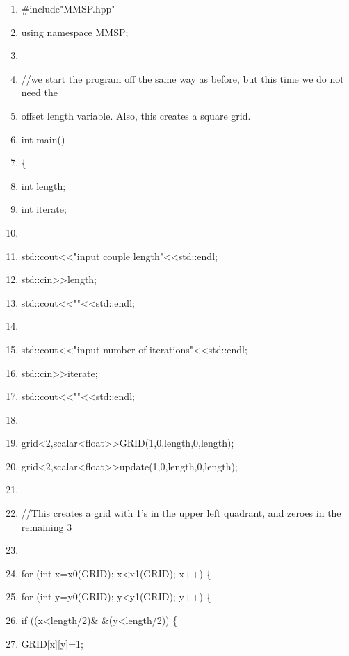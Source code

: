 \documentclass{article}
\begin{document}
\begin{shadebox}
\begin{enumerate} \itemsep1pt \parskip0pt 
\item \#include"MMSP.hpp"
\item using namespace MMSP; 
\item 
\item //we start the program off the same way as before, but this time we do not need the 
\item offset length variable. Also, this creates a square grid.
\item int main()
\item \{ 
\item int length;
\item int iterate;
\item 
\item std::cout\textless \textless "input couple length"\textless \textless std::endl;
\item std::cin\textgreater \textgreater length;
\item std::cout\textless \textless ""\textless \textless std::endl;
\item 
\item std::cout\textless \textless "input number of iterations"\textless \textless std::endl;
\item std::cin\textgreater \textgreater iterate;
\item std::cout\textless \textless ""\textless \textless std::endl;
\item 
\item grid\textless 2,scalar\textless float\textgreater  \textgreater  GRID(1,0,length,0,length); 
\item grid\textless 2,scalar\textless float\textgreater  \textgreater  update(1,0,length,0,length);
\item 
\item //This creates a grid with 1’s in the upper left quadrant, and zeroes in the remaining 3
\item 
\item for (int x=x0(GRID); x\textless x1(GRID); x++) \{
\item \hspace{10pt}         for (int y=y0(GRID); y\textless y1(GRID); y++) \{ 
\item \hspace{10pt} \hspace{10pt}                 if ((x\textless length/2)\& \&(y\textless length/2)) \{
\item \hspace{10pt} \hspace{10pt} \hspace{10pt}                         GRID[x][y]=1;

\end{enumerate}
\end{shadebox}
\end{document}
